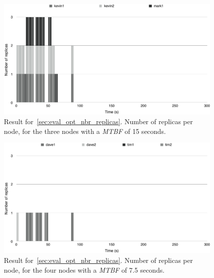 \documentclass{cslthse-msc}
\begin{document}
\begin{figure}[!hbt]
\centering
\includegraphics[scale=0.5]{images/results/optimal_replicas/MTBF_15.pdf}
\caption[Number of replicas in~\cref{sec:eval_opt_nbr_replicas} on nodes with \emph{MTBF} = 15 s]{Result for~\cref{sec:eval_opt_nbr_replicas}. Number of replicas per node, for the three nodes with a \emph{MTBF} of 15 seconds.} \label{fig:exp_opt_replicas_MTBF_15}
\end{figure}

\begin{figure}[!hbt]
\centering
\includegraphics[scale=0.5]{images/results/optimal_replicas/MTBF_75.pdf}
\caption[Number of replicas in~\cref{sec:eval_opt_nbr_replicas} on nodes with \emph{MTBF} = 7.5 s]{Result for~\cref{sec:eval_opt_nbr_replicas}. Number of replicas per node, for the four nodes with a \emph{MTBF} of 7.5 seconds.} \label{fig:exp_opt_replicas_MTBF_75}
\end{figure}
\end{document}
